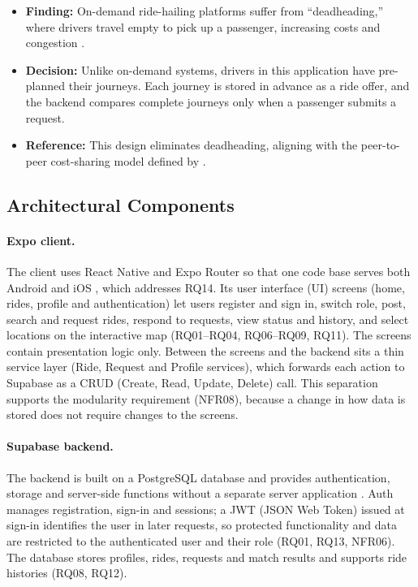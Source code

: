\begin{itemize}
  \item \textbf{Finding:} On-demand ride-hailing platforms suffer from ``deadheading,'' where drivers travel empty to pick up a passenger, increasing costs and congestion \citep{furuhata2013}.
  \item \textbf{Decision:} Unlike on-demand systems, drivers in this application have pre-planned their journeys. Each journey is stored in advance as a ride offer, and the backend compares complete journeys only when a passenger submits a request.
  \item \textbf{Reference:} This design eliminates deadheading, aligning with the peer-to-peer cost-sharing model defined by \citet{furuhata2013}.
\end{itemize}

\subsection{Architectural Components}

\paragraph{Expo client.} The client uses React Native and Expo Router so that one code base serves both Android and iOS \citep{expo2026,meta2026}, which addresses RQ14. Its user interface (UI) screens (home, rides, profile and authentication) let users register and sign in, switch role, post, search and request rides, respond to requests, view status and history, and select locations on the interactive map (RQ01--RQ04, RQ06--RQ09, RQ11). The screens contain presentation logic only. Between the screens and the backend sits a thin service layer (Ride, Request and Profile services), which forwards each action to Supabase as a CRUD (Create, Read, Update, Delete) call. This separation supports the modularity requirement (NFR08), because a change in how data is stored does not require changes to the screens.

\paragraph{Supabase backend.} The backend is built on a PostgreSQL database and provides authentication, storage and server-side functions without a separate server application \citep{supabase2026}. Auth manages registration, sign-in and sessions; a JWT (JSON Web Token) issued at sign-in identifies the user in later requests, so protected functionality and data are restricted to the authenticated user and their role (RQ01, RQ13, NFR06). The database stores profiles, rides, requests and match results and supports ride histories (RQ08, RQ12).

